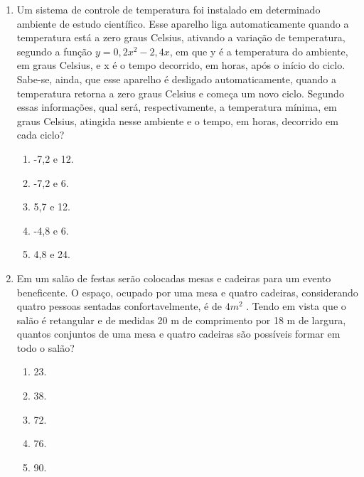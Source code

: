 \documentclass[a4paper,14pt]{article}
\begin{document}
\begin{enumerate}
        \item Um sistema de controle de temperatura foi instalado em determinado ambiente de estudo científico. Esse
        aparelho liga automaticamente quando a temperatura está a zero graus Celsius, ativando a variação de
        temperatura, segundo a função $y = 0,2x^2
        - 2,4x$, em que y é a temperatura do ambiente, em graus Celsius,
        e x é o tempo decorrido, em horas, após o início do ciclo. Sabe-se, ainda, que esse aparelho é desligado
        automaticamente, quando a temperatura retorna a zero graus Celsius e começa um novo ciclo.
        Segundo essas informações, qual será, respectivamente, a temperatura mínima, em graus Celsius,
        atingida nesse ambiente e o tempo, em horas, decorrido em cada ciclo?
        \begin{enumerate}
        	\item -7,2 e 12.
        	\item -7,2 e 6.
        	\item 5,7 e 12.
        	\item -4,8 e 6.
        	\item 4,8 e 24.
        \end{enumerate}
        
        \item Em um salão de festas serão colocadas mesas e cadeiras para um evento beneficente. O espaço,
        ocupado por uma mesa e quatro cadeiras, considerando quatro pessoas sentadas confortavelmente,
        é de $4m^2$
        .
        Tendo em vista que o salão é retangular e de medidas 20 m de comprimento por 18 m de largura, quantos
        conjuntos de uma mesa e quatro cadeiras são possíveis formar em todo o salão?
        \begin{enumerate}
			\item 23.
			\item 38.
			\item 72.
			\item 76.
			\item 90.
		\end{enumerate}
	

\end{enumerate}
\end{document}
